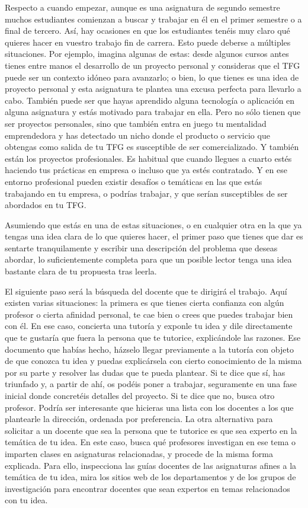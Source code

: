 Respecto a cuando empezar, aunque es una asignatura de segundo semestre muchos estudiantes comienzan a buscar y trabajar en él en el primer semestre o a final de tercero. Así, hay ocasiones en que los estudiantes tenéis muy claro qué quieres hacer en vuestro trabajo fin de carrera. Esto puede deberse a múltiples situaciones. Por ejemplo, imagina algunas de estas: desde algunos cursos antes tienes entre manos el desarrollo de un proyecto personal y consideras que el TFG puede ser un contexto idóneo para avanzarlo; o bien, lo que tienes es una idea de proyecto personal y esta asignatura te plantea una excusa perfecta para llevarlo a cabo. También puede ser que hayas aprendido alguna tecnología o aplicación en alguna asignatura y estás motivado para trabajar en ella. Pero no sólo tienen que ser proyectos personales, sino que también entra en juego tu mentalidad emprendedora y has detectado un nicho donde el producto o servicio que obtengas como salida de tu TFG es susceptible de ser comercializado. Y también están los proyectos profesionales. Es habitual que cuando llegues a cuarto estés haciendo tus prácticas en empresa o incluso que ya estés contratado. Y en ese entorno profesional pueden existir desafíos o temáticas en las que estás trabajando en tu empresa, o podrías trabajar, y que serían susceptibles de ser abordados en tu TFG.

Asumiendo que estás en una de estas situaciones, o en cualquier otra en la que ya tengas una idea clara de lo que quieres hacer, el primer paso que tienes que dar es sentarte tranquilamente y escribir una descripción del problema que deseas abordar, lo suficientemente completa para que un posible lector tenga una idea bastante clara de tu propuesta tras leerla. 

El siguiente paso será la búsqueda del docente que te dirigirá el trabajo. Aquí existen varias situaciones: la primera es que tienes cierta confianza con algún profesor o cierta afinidad personal, te cae bien o crees que puedes trabajar bien con él. En ese caso, concierta una tutoría y exponle tu idea y dile directamente que te gustaría que fuera la persona que te tutorice, explicándole las razones. Ese documento que habías hecho, házselo llegar previamente a la tutoría con objeto de que conozca tu idea y puedas explicársela con cierto conocimiento de la misma por su parte y resolver las dudas que te pueda plantear. Si te dice que sí, has triunfado y, a partir de ahí, os podéis poner a trabajar, seguramente en una fase inicial donde concretéis detalles del proyecto. Si te dice que no, busca otro profesor. Podría ser interesante que hicieras una lista con los docentes a los que plantearle la dirección, ordenada por preferencia. La otra alternativa para solicitar a un docente que sea la persona que te tutorice es que sea experto en la temática de tu idea. En este caso, busca qué profesores investigan en ese tema o imparten clases en asignaturas relacionadas, y procede de la misma forma explicada. Para ello, inspecciona las guías docentes de las asignaturas afines a la temática de tu idea, mira los sitios web de los departamentos y de los grupos de investigación para encontrar docentes que sean expertos en temas relacionados con tu idea. 

